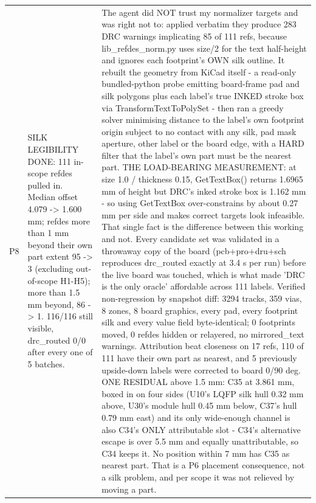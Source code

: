\documentclass[11pt,a4paper]{article}
\begin{document}
{\begin{longtable}{lp{5.2cm}p{7.2cm}}
P8 & SILK LEGIBILITY DONE: 111 in-scope refdes pulled in. Median offset 4.079 -\textgreater{} 1.600 mm; refdes more than 1 mm beyond their own part extent 95 -\textgreater{} 3 (excluding out-of-scope H1-H5); more than 1.5 mm beyond, 86 -\textgreater{} 1. 116/116 still visible, drc\_routed 0/0 after every one of 5 batches. & The agent did NOT trust my normalizer targets and was right not to: applied verbatim they produce 283 DRC warnings implicating 85 of 111 refs, because lib\_refdes\_norm.py uses size/2 for the text half-height and ignores each footprint's OWN silk outline. It rebuilt the geometry from KiCad itself - a read-only bundled-python probe emitting board-frame pad and silk polygons plus each label's true INKED stroke box via TransformTextToPolySet - then ran a greedy solver minimising distance to the label's own footprint origin subject to no contact with any silk, pad mask aperture, other label or the board edge, with a HARD filter that the label's own part must be the nearest part. THE LOAD-BEARING MEASUREMENT: at size 1.0 / thickness 0.15, GetTextBox() returns 1.6965 mm of height but DRC's inked stroke box is 1.162 mm - so using GetTextBox over-constrains by about 0.27 mm per side and makes correct targets look infeasible. That single fact is the difference between this working and not. Every candidate set was validated in a throwaway copy of the board (pcb+pro+dru+sch reproduces drc\_routed exactly at 3.4 s per run) before the live board was touched, which is what made 'DRC is the only oracle' affordable across 111 labels. Verified non-regression by snapshot diff: 3294 tracks, 359 vias, 8 zones, 8 board graphics, every pad, every footprint silk and every value field byte-identical; 0 footprints moved, 0 refdes hidden or relayered, no mirrored\_text warnings. Attribution beat closeness on 17 refs, 110 of 111 have their own part as nearest, and 5 previously upside-down labels were corrected to board 0/90 deg. ONE RESIDUAL above 1.5 mm: C35 at 3.861 mm, boxed in on four sides (U10's LQFP silk hull 0.32 mm above, U30's module hull 0.45 mm below, C37's hull 0.79 mm east) and its only wide-enough channel is also C34's ONLY attributable slot - C34's alternative escape is over 5.5 mm and equally unattributable, so C34 keeps it. No position within 7 mm has C35 as nearest part. That is a P6 placement consequence, not a silk problem, and per scope it was not relieved by moving a part. \\

\end{longtable}}
\end{document}
